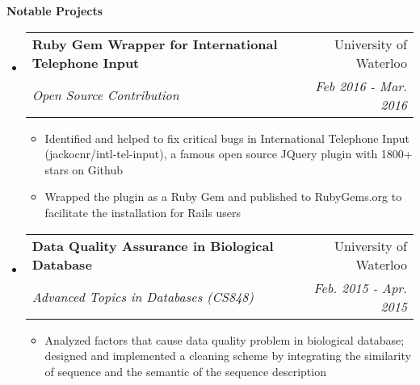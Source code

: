\documentclass[letterpaper,10pt]{article}
\makeatletter
\newcommand{\resitem}[1]{\item #1 \vspace{-2pt}}
\newcommand{\resheading}[1]{{\large \colorbox{mygrey}{\begin{minipage}{\textwidth}{\textbf{#1 \vphantom{p\^{E}}}}\end{minipage}}}}
\newcommand{\ressubheading}[4]{
\begin{tabular*}{7.0in}{l@{\extracolsep{\fill}}r}
		\textbf{#1} & #2 \\
		\textit{#3} & \textit{#4} \\
\end{tabular*}\vspace{-6pt}}
\makeatother
\begin{document}
\resheading{Notable Projects}
\begin{itemize}
\itemsep0em
\item
    \ressubheading{Ruby Gem Wrapper for International Telephone Input}{University of Waterloo}{Open Source Contribution}{Feb 2016 - Mar. 2016}
	\begin{itemize}
            \resitem{Identified and helped to fix critical bugs in International Telephone Input (jackocnr/intl-tel-input), a famous open source JQuery plugin with 1800+ stars on Github}
		\resitem{Wrapped the plugin as a Ruby Gem and published to RubyGems.org to facilitate the installation for Rails users}
	\end{itemize}
\item
	\ressubheading{Data Quality Assurance in Biological Database}{University of Waterloo}{ Advanced Topics in Databases (CS848)}{ Feb. 2015 - Apr. 2015}
	\begin{itemize}
		\resitem{Analyzed factors that cause data quality problem in biological database; designed and implemented a cleaning scheme by integrating the similarity of sequence and the semantic of the sequence description}
	\end{itemize}
	
\end{itemize}
\end{document}
